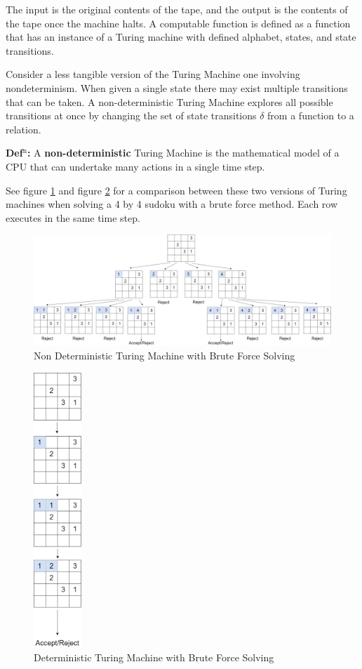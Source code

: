 \documentclass[a4paper,11pt]{report}
\newcounter{row}
\begin{document}
The input is the original contents of the tape, and the output is the contents of the tape once the machine halts. A computable function is defined as a function that has an instance of a Turing machine with defined alphabet, states, and state transitions.

Consider a less tangible version of the Turing Machine one involving nondeterminism. When given a single state there may exist multiple transitions that can be taken. A non-deterministic Turing Machine explores all possible transitions at once by changing the set of state transitions $\delta$ from a function to a relation. 

\textbf{Def$^\text{n}$:} A \textbf{non-deterministic} Turing Machine is the mathematical model of a CPU that can undertake many actions in a single time step.

See figure \ref{ndtm} and figure \ref{dtm} for a comparison between these two versions of Turing machines when solving a 4 by 4 sudoku with a brute force method. Each row executes in the same time step.

\begin{figure}[h!]
\begin{center}
\includegraphics[width=180mm]{figures/turing_non_determinism.png}
\end{center}
\caption{\label{ndtm} Non Deterministic Turing Machine with Brute Force Solving}
\end{figure}

\begin{figure}[h!]
\begin{center}
\includegraphics[width=18mm]{figures/turing_determinism.png}
\end{center}
\caption{\label{dtm} Deterministic Turing Machine with Brute Force Solving}
\end{figure}
\end{document}

